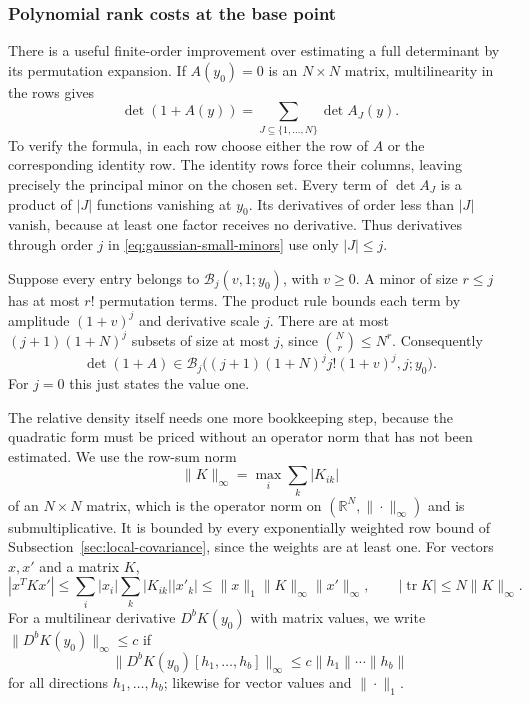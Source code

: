 \subsubsection{Polynomial rank costs at the base point}
There is a useful finite-order improvement over estimating a full
determinant by its permutation expansion. If $A(y_0)=0$ is an
$N\times N$ matrix, multilinearity in the rows gives
\begin{equation}\label{eq:gaussian-small-minors}
 \det(1+A(y))=\sum_{J\subseteq\{1,\ldots,N\}}\det A_J(y).
\end{equation}
To verify the formula, in each row choose either the row of $A$
or the corresponding identity row. The identity rows force their
columns, leaving precisely the principal minor on the chosen set.
Every term of $\det A_J$ is a product of $|J|$ functions vanishing
at $y_0$. Its derivatives of order less than $|J|$ vanish, because
at least one factor receives no derivative. Thus derivatives through
order $j$ in \eqref{eq:gaussian-small-minors} use only $|J|\le j$.

Suppose every entry belongs to $\mathcal B_j(v,1;y_0)$, with
$v\ge0$. A minor of size $r\le j$ has at most $r!$ permutation
terms. The product rule bounds each term by amplitude
$(1+v)^j$ and derivative scale $j$. There are at most
$(j+1)(1+N)^j$ subsets of size at most $j$, since
$\binom Nr\le N^r$. Consequently
\[
 \det(1+A)\in
 \mathcal B_j\bigl((j+1)(1+N)^j j!(1+v)^j,j;y_0\bigr).
\]
For $j=0$ this just states the value one.

The relative density itself needs one more bookkeeping step, because
the quadratic form must be priced without an operator norm that has
not been estimated. We use the row-sum norm
\[
 \|K\|_\infty=\max_i\sum_k|K_{ik}|
\]
of an $N\times N$ matrix, which is the operator norm on
$(\mathbb R^N,\|\cdot\|_\infty)$ and is submultiplicative. It is
bounded by every exponentially weighted row bound of
Subsection~\ref{sec:local-covariance}, since the weights are at least one.
For vectors $x,x'$ and a matrix $K$,
\begin{equation}\label{eq:gaussian-l1-linf}
 |x^TKx'|\le\sum_i|x_i|\sum_k|K_{ik}||x'_k|
 \le\|x\|_1\|K\|_\infty\|x'\|_\infty,
 \qquad |\operatorname{tr}K|\le N\|K\|_\infty .
\end{equation}
For a multilinear derivative $D^bK(y_0)$ with matrix values, we write
$\|D^bK(y_0)\|_\infty\le c$ if
\[
 \|D^bK(y_0)[h_1,\ldots,h_b]\|_\infty\le c\|h_1\|\cdots\|h_b\|
\] for all
directions $h_1,\ldots,h_b$; likewise for vector values and $\|\cdot\|_1$.

